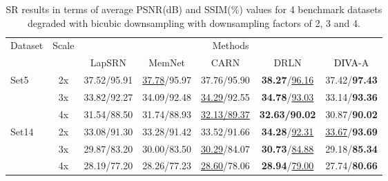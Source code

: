 \documentclass[10pt,journal,compsoc]{IEEEtran}
\newcommand\bdr[1]{{\textbf{#1}}}
\newcommand\bdb[1]{{\underline{#1}}}
\newcommand{\dk}{\textcolor{black}}
\begin{document}

\begin{table}[t!]
\setlength\tabcolsep{1.7pt}

\begin{scriptsize}
\begin{center}
\caption{SR results in terms of average PSNR(dB) and SSIM(\%) values for 4 benchmark datasets degraded with bicubic downsampling with downsampling factors of 2, 3 and 4.}
\label{tab:tab_psnr_ssim_BiCuSupReso}
\begin{tabular}{l c ccccc}
\hline

Dataset & Scale & \multicolumn{5}{c}{Methods}\\ 

& & LapSRN\cite{Lai2017deep} & MemNet\cite{Tai2017MemNet} & CARN\cite{Ahn2018fast} & DRLN\cite{Anwar2022densely} & \dk{DIVA}-A \\
\hline


\multirow{3}{*}{Set5}

& 2x & 37.52/95.91 & \bdb{37.78}/95.97 & 37.76/95.90 & \bdr{38.27}/\bdb{96.16} & 37.42/\bdr{97.43} \\

& 3x & 33.82/92.27 & 34.09/92.48 & \bdb{34.29}/92.55 & \bdr{34.78}/\bdb{93.03} & 33.14/\bdr{93.36} \\

& 4x & 31.54/88.50 & 31.74/88.93 & \bdb{32.13/89.37} & \bdr{32.63/90.02} & 30.87/\bdr{90.02} \\

\hline


\multirow{3}{*}{Set14}

& 2x & 33.08/91.30 & 33.28/91.42 & 33.52/91.66 & \bdr{34.28}/\bdb{92.31} & \bdb{33.67}/\bdr{93.69} \\

& 3x & 29.87/83.20 & 30.00/83.50 & \bdb{30.29}/84.07 & \bdr{30.73}/\bdb{84.88} & 29.18/\bdr{85.34} \\

& 4x & 28.19/77.20 & 28.26/77.23 & \bdb{28.60}/78.06 & \bdr{28.94}/\bdb{79.00} & 27.74/\bdr{80.66} \\

\hline



\end{tabular}
\end{center}
\end{scriptsize}
\end{table}
\end{document}
